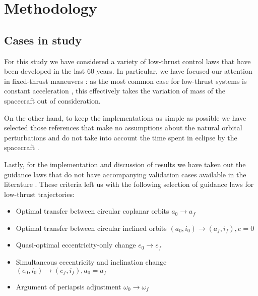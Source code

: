 \chapter{Methodology} \label{methodology}

\section{Cases in study} \label{cases}

For this study we have considered a variety of low-thrust control
laws that have been developed in the last 60 years. In particular,
we have focused our attention in fixed-thrust maneuvers : as the most common case for
low-thrust systems is constant acceleration , this 
effectively takes the variation of mass of the spacecraft out of 
consideration.

On the other hand, to keep the implementations as simple 
as possible  we 
have selected those references that make no assumptions about the 
natural orbital perturbations and do not take into account the time 
spent in eclipse by the spacecraft .

Lastly, for the implementation and discussion of 
results we have taken out the guidance laws that do not have 
accompanying validation cases available in the literature . These criteria left us with the following selection of guidance laws for low-thrust trajectories:


\begin{itemize}
\item Optimal transfer between circular coplanar orbits $a_0 \rightarrow a_f$ \cite{edelbaum1961propulsion,burt1967space}
\item Optimal transfer between circular inclined orbits $(a_0, i_0) \rightarrow (a_f, i_f), e = 0$ \cite{edelbaum1961propulsion,kechichian1997reformulation}
\item Quasi-optimal eccentricity-only change $e_0 \rightarrow e_f$ \cite{pollard1997simplified}
\item Simultaneous eccentricity and inclination change $(e_0, i_0) \rightarrow (e_f, i_f), a_0 = a_f$ \cite{pollard2000simplified}
\item Argument of periapsis adjustment $\omega_0 \rightarrow \omega_f$ \cite{pollard1998evaluation}
\end{itemize}

